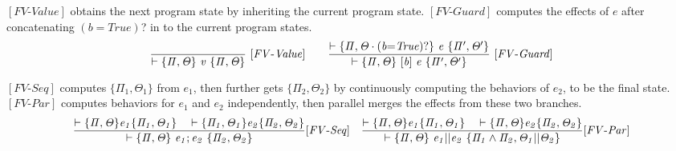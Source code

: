 \documentclass[acmsmall,10pt,review]{acmart}
\newcommand{\code}[1]{{\tt{\ensuremath{\m{#1}}}}}
\newcommand{\m}{\mathit}
\begin{document}
{\begin{comment}
\end{comment}

\vspace{1mm}
$[FV\text{-}\m{Value}]$  obtains the next program state by 
inheriting the current program state.
$[FV\text{-}Guard]$ computes the effects of \code{e} after concatenating
\code{(b{=}True)}? in to the current program states.  
{{\small\begin{gather*}
  \code{\frac{
  }
{  \vdash \{  \Pi, \Theta \}\  v \ 
\{ \Pi, \Theta \}} \  
 {[FV\text{-}Value]}} 
 \qquad
 \code{\frac{
  \vdash \{  \Pi, \Theta \cdot (b{=}True)? \}\  e \ 
  \{ \Pi^\prime, \Theta^\prime \}
  }
{  \vdash \{  \Pi, \Theta \}\  [b]\ e \ 
\{  \Pi^\prime, \Theta^\prime \}} \  
 {[FV\text{-}Guard]}} 
\end{gather*}}}

\vspace{1mm}
$[FV\text{-}Seq]$ computes  \code{ \{  \Pi_1, \Theta_1\} } 
from \code{e_1}, 
then further gets  \code{ \{  \Pi_2, \Theta_2 \} } by 
continuously computing the behaviors of \code{e_2}, to be the final state.
$[FV\text{-}Par]$ computes behaviors for  \code{e_1} and \code{e_2} independently,
then parallel merges the effects from these two branches.  
{{\small\begin{gather*}
  \code{\frac{ 
 \vdash \{ \Pi, \Theta\}  e_1  \{  \Pi_1, \Theta_1\} 
\ \  \ 
\vdash \{ \Pi_1, \Theta_1\}  e_2   \{  \Pi_2, \Theta_2 \} 
}{
  \vdash \{  \Pi, \Theta \}\  
  e_1;e_2 \ \{ \Pi_2, \Theta_2
  \}} 
   {[FV\text{-}Seq]}}  
\quad 
  \code{\frac{
 \vdash \{ \Pi, \Theta \}  e_1   \{  \Pi_1, \Theta_1\} 
\ \  \ 
\vdash \{  \Pi, \Theta \}  e_2   \{  \Pi_2, \Theta_2 \} 
    }{
\vdash \{   \Pi, \Theta \}\  e_1 || e_2 \ \{ 
\Pi_1  \wedge \Pi_2 , \Theta_1 || \Theta_2
\}}  
{[FV\text{-}Par]}} 
\end{gather*}}}


}
\end{document}
